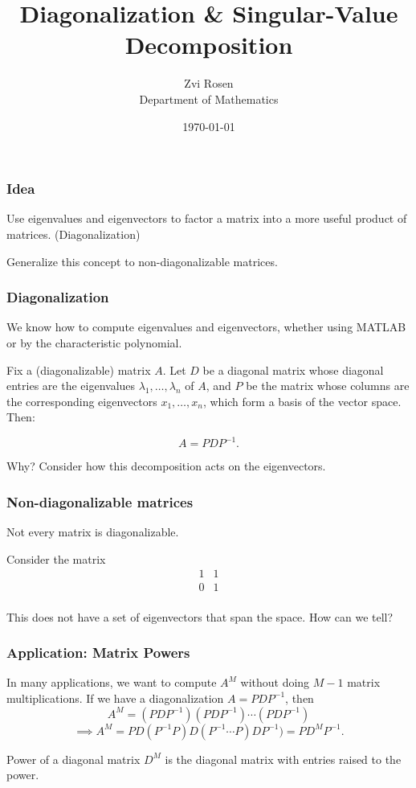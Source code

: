 \documentclass[12pt]{beamer}
\theoremstyle{definition}
\begin{document}
\author[Z. Rosen]{Zvi Rosen \\ Department of Mathematics}

\date[\today]{\today}
\title[Singular-Value Decomposition]{{\Large Diagonalization \&
 Singular-Value Decomposition}}


\frame{\titlepage}


\begin{frame}
\frametitle{Idea}
Use eigenvalues and eigenvectors to factor a matrix
into a more useful product of matrices. (Diagonalization)

Generalize this concept to non-diagonalizable matrices.
\end{frame}

\begin{frame}
\frametitle{Diagonalization}
We know how to compute eigenvalues and eigenvectors, whether
using MATLAB or by the characteristic polynomial. 

Fix a (diagonalizable) matrix $A$.
Let $D$ be a diagonal matrix whose diagonal entries are the eigenvalues 
$\lambda_1,\ldots,\lambda_n$ of $A$, and $P$ be the matrix whose columns
are the corresponding eigenvectors $x_1,\ldots,x_n$, which form a basis
of the vector space. Then:

\[ A = P D P^{-1}.\]

Why? Consider how this decomposition acts on the eigenvectors.

\end{frame}


\begin{frame}
\frametitle{Non-diagonalizable matrices}

Not every matrix is diagonalizable.

Consider the matrix
\[\begin{array}{cc}
1 & 1 \\
0 & 1 \\
\end{array}\]

This does not have a set of eigenvectors that
span the space. How can we tell?
\end{frame}


\begin{frame}
\frametitle{Application: Matrix Powers}
In many applications, we want to compute $A^M$ without
doing $M-1$ matrix multiplications. If we have a diagonalization
$A= P D P^{-1}$, then
\[ A^M = (PD P^{-1})(PD P^{-1})\cdots (PD P^{-1})\]
\[\implies A^M = P D (P^{-1}P )D (P^{-1}\cdots P) D P^{-1}) = P D^M P^{-1}.\]

Power of a diagonal matrix $D^M$ is the diagonal matrix with entries
raised to the power.
\end{frame}
\end{document}

